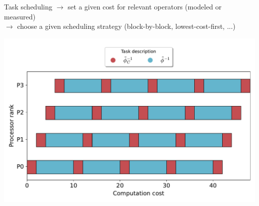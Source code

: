 \documentclass[11pt,aspectratio=43]{beamer}
\begin{document}
\begin{frame}{Task scheduling}
	$\rightarrow$ set a given cost for relevant operators (modeled or measured)\\
	$\rightarrow$ choose a given scheduling strategy (block-by-block, lowest-cost-first, ...)
	\begin{center}
		\includegraphics[width=0.85\linewidth]{PFASSTSchedule.pdf}
	\end{center}
\end{frame}
\end{document}
